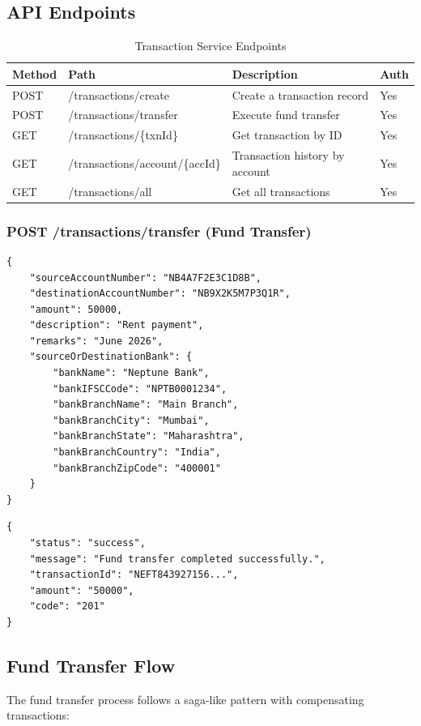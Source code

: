 \documentclass[12pt,a4paper]{report}
\begin{document}
\subsection{API Endpoints}

\begin{table}[H]
\centering
\caption{Transaction Service Endpoints}
\begin{tabularx}{\textwidth}{llXl}
\toprule
\textbf{Method} & \textbf{Path} & \textbf{Description} & \textbf{Auth} \\
\midrule
POST & /transactions/create & Create a transaction record & Yes \\
POST & /transactions/transfer & Execute fund transfer & Yes \\
GET & /transactions/\{txnId\} & Get transaction by ID & Yes \\
GET & /transactions/account/\{accId\} & Transaction history by account & Yes \\
GET & /transactions/all & Get all transactions & Yes \\
\bottomrule
\end{tabularx}
\end{table}

\subsubsection{POST /transactions/transfer (Fund Transfer)}

\begin{lstlisting}[style=jsonstyle, caption={Fund Transfer Request}]
{
    "sourceAccountNumber": "NB4A7F2E3C1D8B",
    "destinationAccountNumber": "NB9X2K5M7P3Q1R",
    "amount": 50000,
    "description": "Rent payment",
    "remarks": "June 2026",
    "sourceOrDestinationBank": {
        "bankName": "Neptune Bank",
        "bankIFSCCode": "NPTB0001234",
        "bankBranchName": "Main Branch",
        "bankBranchCity": "Mumbai",
        "bankBranchState": "Maharashtra",
        "bankBranchCountry": "India",
        "bankBranchZipCode": "400001"
    }
}
\end{lstlisting}

\begin{lstlisting}[style=jsonstyle, caption={Fund Transfer Response (Success)}]
{
    "status": "success",
    "message": "Fund transfer completed successfully.",
    "transactionId": "NEFT843927156...",
    "amount": "50000",
    "code": "201"
}
\end{lstlisting}

\subsection{Fund Transfer Flow}
The fund transfer process follows a saga-like pattern with compensating transactions:
\end{document}

